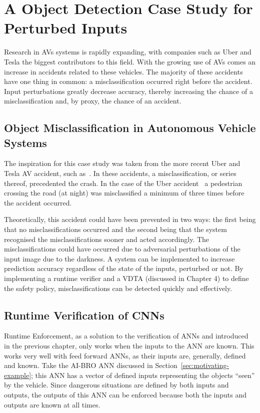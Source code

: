 \section{A Object Detection Case Study for Perturbed Inputs}
Research in \acfp{AV} systems is rapidly expanding, with companies such as Uber and Tesla the biggest contributors to this field.
With the growing use of \acp{AV} comes an increase in accidents related to these vehicles.
The majority of these accidents have one thing in common: a misclassification occurred right before the accident.
Input perturbations greatly decrease accuracy, thereby increasing the chance of a misclassification and, by proxy, the chance of an accident.

\subsection{Object Misclassification in Autonomous Vehicle Systems}
The inspiration for this case study was taken from the more recent Uber and Tesla \ac{AV} accident, such as~\cite{coldewey_2018}.
In these accidents, a misclassification, or series thereof, precedented the crash.
In the case of the Uber accident~\cite{coldewey_2018} a pedestrian crossing the road (at night) was misclassified a minimum of three times before the accident occurred.

Theoretically, this accident could have been prevented in two ways: the first being that no misclassifications occurred and the second being that the system recognised the misclassifications sooner and acted accordingly.
The misclassifications could have occurred due to adversarial perturbations of the input image due to the darkness. 
A system can be implemented to increase prediction accuracy regardless of the state of the inputs, perturbed or not.
By implementing a runtime verifier and a \acf{VDTA} (discussed in Chapter 4) to define the safety policy, misclassifications can be detected quickly and effectively.

\subsection{Runtime Verification of \acfp{CNN}}
Runtime Enforcement, as a solution to the verification of \acp{ANN} and introduced in the previous chapter, only works when the inputs to the \ac{ANN} are known.
This works very well with feed forward \acp{ANN}, as their inputs are, generally, defined and known.
Take the AI-BRO \ac{ANN} discussed in Section~\ref{sec:motivating-example}; this \ac{ANN} has a vector of defined inputs representing the objects ``seen'' by the vehicle.
Since dangerous situations are defined by both inputs and outputs, the outputs of this \ac{ANN} can be enforced because both the inputs and outputs are known at all times.

